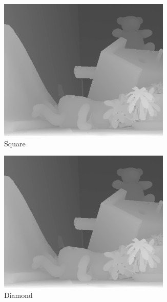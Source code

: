 \documentclass{article}
\begin{document}
\begin{CJK*}{UTF8}{bkai}
\begin{figure}[h]
\centering
    \begin{subfigure}{.3\textwidth}
        \centering
        \includegraphics[width=0.9\textwidth]{results/rect.png}
        \caption{Square}
    \end{subfigure}
    \begin{subfigure}{.3\textwidth}
        \centering
        \includegraphics[width=0.9\textwidth]{results/diamond.png}
        \caption{Diamond}
    \end{subfigure}
    \begin{subfigure}{.3\textwidth}
        \centering

\end{subfigure}
\end{figure}
\end{CJK*}
\end{document}
